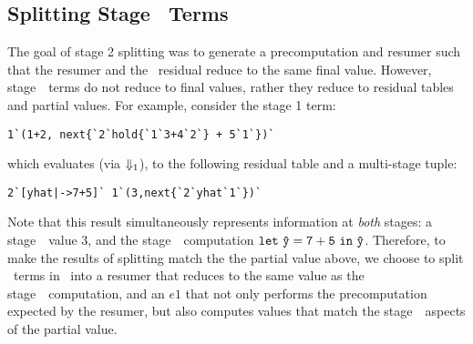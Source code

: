 \subsection{Splitting Stage \bbone\ Terms}


The goal of stage 2 splitting was to generate a precomputation and resumer such that the resumer and the \lang\ residual reduce to the same final value. However, stage~\bbone\ terms do not reduce to final values, rather they reduce to residual tables and partial values.  For example, consider the stage 1 term: 
\begin{lstlisting}
1`(1+2, next{`2`hold{`1`3+4`2`} + 5`1`})`
\end{lstlisting}
which evaluates (via $\mathbin{{\Downarrow_{ 1}}}$), to the following residual table and a multi-stage tuple:

\begin{lstlisting}
2`[yhat|->7+5]` 1`(3,next{`2`yhat`1`})`
\end{lstlisting}





Note that this result simultaneously represents information at {\em both} stages: 
a stage~\bbone\ value 3, and the stage~\bbtwo\ computation ${\tt let}~{\mathtt{\hat y}} = {\mathtt{7+5}}~{\tt in}~{\mathtt{\hat y}}$. 
Therefore, to make the results of splitting match the the partial value above, we choose to split \bbone\ terms in \lang\ into a resumer that reduces to the same value as the stage~\bbtwo\ computation, and an $e1$ that not only performs the precomputation expected by the resumer, but also computes values that match the stage~\bbone\ aspects of the partial value.

